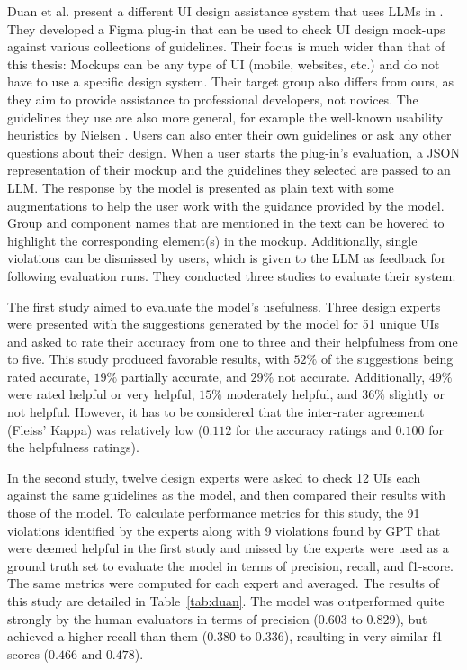 \documentclass[11pt,titlepage,oneside,openany]{book}
\begin{document}
Duan et al. present a different UI design assistance system that uses LLMs in \cite{duan_generating_2024}. They developed a Figma plug-in that can be used to check UI design mock-ups against various collections of guidelines. Their focus is much wider than that of this thesis: Mockups can be any type of UI (mobile, websites, etc.) and do not have to use a specific design system. Their target group also differs from ours, as they aim to provide assistance to professional developers, not novices. The guidelines they use are also more general, for example the well-known usability heuristics by Nielsen \cite{experience_10_nodate}. Users can also enter their own guidelines or ask any other questions about their design. When a user starts the plug-in's evaluation, a JSON representation of their mockup and the guidelines they selected are passed to an LLM. The response by the model is presented as plain text with some augmentations to help the user work with the guidance provided by the model. Group and component names that are mentioned in the text can be hovered to highlight the corresponding element(s) in the mockup. Additionally, single violations can be dismissed by users, which is given to the LLM as feedback for following evaluation runs. They conducted three studies to evaluate their system: 

The first study aimed to evaluate the model's usefulness. Three design experts were presented with the suggestions generated by the model for 51 unique UIs and asked to rate their accuracy from one to three and their helpfulness from one to five. This study produced favorable results, with $52\%$ of the suggestions being rated accurate, $19\%$ partially accurate, and $29\%$ not accurate. Additionally, $49\%$ were rated helpful or very helpful, $15\%$ moderately helpful, and $36\%$ slightly or not helpful. However, it has to be considered that the inter-rater agreement (Fleiss' Kappa) was relatively low ($0.112$ for the accuracy ratings and $0.100$ for the helpfulness ratings). 

In the second study, twelve design experts were asked to check 12 UIs each against the same guidelines as the model, and then compared their results with those of the model. To calculate performance metrics for this study, the 91 violations identified by the experts along with 9 violations found by GPT that were deemed helpful in the first study and missed by the experts were used as a ground truth set to evaluate the model in terms of precision, recall, and f1-score. The same metrics were computed for each expert and averaged. The results of this study are detailed in Table~\ref{tab:duan}. The model was outperformed quite strongly by the human evaluators in terms of precision ($0.603$ to $0.829$), but achieved a higher recall than them ($0.380$ to $0.336$), resulting in very similar f1-scores ($0.466$ and $0.478$). 
\end{document}
